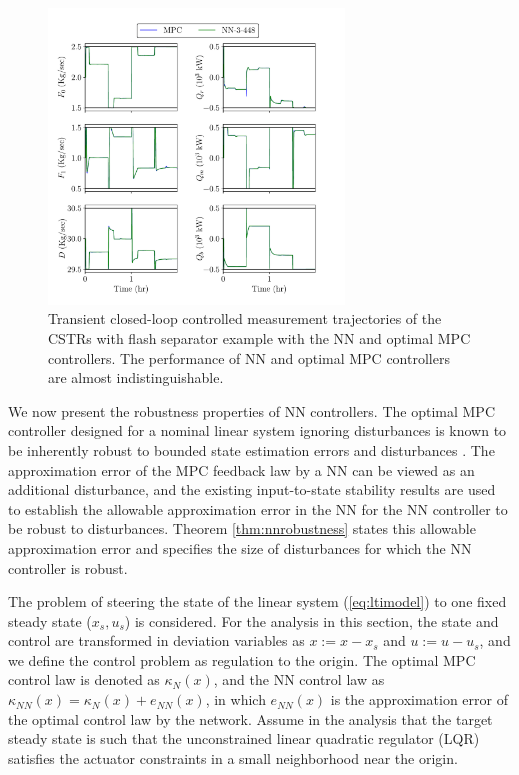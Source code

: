 \documentclass[preprint,5p, twocolumn, authoryear]{elsarticle}
\begin{document}
\begin{figure}[!h]
    \centering
	\includegraphics[page=2, width=0.7\textwidth,
		height=0.5\textheight]{cstrs_comparision_plots.pdf} \caption{Transient
		closed-loop controlled measurement trajectories of the CSTRs with flash
		separator example with the NN and optimal MPC controllers. The
		performance of NN and optimal MPC controllers are almost
		indistinguishable.}
		\label{fig:cl_cstrs_outputs}
\end{figure}

We now present the robustness properties of NN controllers. The optimal MPC
controller designed for a nominal linear system ignoring disturbances is known
to be inherently robust to bounded state estimation errors and disturbances
\citep*{heath:wills:2005, pannocchia:rawlings:wright:2011}. The approximation
error of the MPC feedback law by a NN can be viewed as an additional
disturbance, and the existing input-to-state stability results
\citep*{sontag:wang:1995} are used to establish the allowable approximation
error in the NN for the NN controller to be robust to disturbances. Theorem
\ref{thm:nnrobustness} states this allowable approximation error and specifies
the size of disturbances for which the NN controller is robust.

The problem of steering the state of the linear system (\ref{eq:ltimodel}) to
one fixed steady state ($x_s, u_s$) is considered. For the analysis in this
section, the state and control are transformed in deviation variables as $x := x
- x_s$ and $u := u -u_s$, and we define the control problem as regulation to the
origin. The optimal MPC control law is denoted as $\kappa_N(x)$, and the NN
control law as $\kappa_{NN}(x) = \kappa_N(x) + e_{NN}(x)$, in which $e_{NN}(x)$
is the approximation error of the optimal control law by the network. Assume in
the analysis that the target steady state is such that the unconstrained linear
quadratic regulator (LQR) satisfies the actuator constraints in a small
neighborhood near the origin. 
\end{document}
